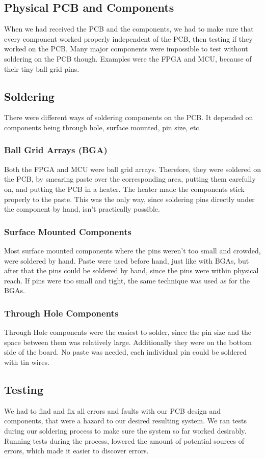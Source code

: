\begin{itemize}
\section{Physical PCB and Components}
When we had received the PCB and the components, we had to make sure that every component worked properly independent of the PCB, then testing if they worked on the PCB. Many major components were impossible to test without soldering on the PCB though. Examples were the FPGA and MCU, because of their tiny ball grid pins.

\subsection{Soldering}
There were different ways of soldering components on the PCB. It depended on components being through hole, surface mounted, pin size, etc.
\subsubsection{Ball Grid Arrays (BGA)}
Both the FPGA and MCU were ball grid arrays.
Therefore, they were soldered on the PCB, by smearing paste over the corresponding area, putting them carefully on, and putting the PCB in a heater. The heater made the components stick properly to the paste. This was the only way, since soldering pins directly under the component by hand, isn't practically possible.

\subsubsection{Surface Mounted Components}
Most surface mounted components where the pins weren't too small and crowded, were soldered by hand. Paste were used before hand, just like with BGAs, but after that the pins could be soldered by hand, since the pins were within physical reach. 
\newline
If pins were too small and tight, the same technique was used as for the BGAs.

\subsubsection{Through Hole Components}
Through Hole components were the easiest to solder, since the pin size and the space between them was relatively large. Additionally they were on the bottom side of the board. No paste was needed, each individual pin could be soldered with tin wires.

\subsection{Testing}
We had to find and fix all errors and faults with our PCB design and components, that were a hazard to our desired resulting system.  
We ran tests during our soldering process to make sure the system so far worked desirably. Running tests during the process, lowered the amount of potential sources of errors, which made it easier to discover errors.


\end{itemize}
